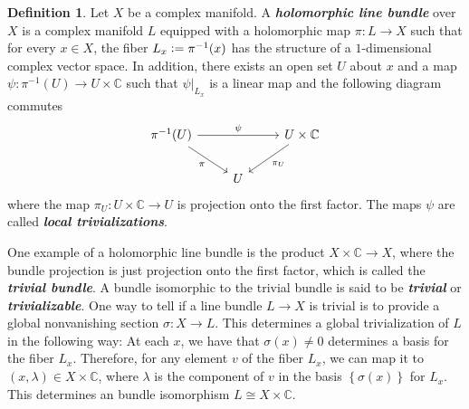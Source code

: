 \documentclass[psamsfonts, 12pt]{amsart}
\theoremstyle{definition}
\newtheorem{defn}[thm]{Definition}
\theoremstyle{remark}
\newcommand{\ib}[1]{\textbf{\textit{#1}}}
\newcommand{\C}{\mathbb{C}}
\newcommand{\inv}{^{-1}}
\newcommand{\set}[1]{\left\lbrace #1 \right\rbrace}
\newcommand{\defeq}{\vcentcolon=}
\begin{document}
%
\begin{defn}
Let $X$ be a complex manifold. A \ib{holomorphic line bundle} over $X$ is a complex
manifold $L$ equipped with a holomorphic map $\pi : L \to X$ such that for every
$x \in X$,  the fiber $L_x \defeq \pi\inv(x)$ has the structure of a $1$-dimensional
complex vector space. In addition, there exists an open set $U$ about $x$ and
a map $\psi : \pi\inv(U) \to U \times \C$ such that $\psi\vert_{L_x}$ is a linear
map and the following diagram commutes
\[\begin{tikzcd}
\pi\inv(U) \ar[dr, "\pi"'] \ar[rr, "\psi"] & & U \times \C \ar[dl, "\pi_U"]\\
& U
\end{tikzcd}\]
where the map $\pi_U : U \times \C \to U$ is projection onto the first factor.
The maps $\psi$ are called \ib{local trivializations}.
\end{defn}
%
One example of a holomorphic line bundle is the product $X \times \C \to X$, where
the bundle projection is just projection onto the first factor, which
is called the \ib{trivial bundle}. A bundle isomorphic to the trivial bundle
is said to be \ib{trivial} or \ib{trivializable}.
One way to tell if a line bundle $L \to X$ is trivial is to provide a global
nonvanishing section $\sigma : X \to L$. This determines a global trivialization of $L$
in the following way: At each $x$, we have that $\sigma(x) \neq 0$ determines a basis for
the fiber $L_x$. Therefore, for any element $v$ of the fiber $L_x$, we can map it
to $(x, \lambda) \in X \times \C$, where $\lambda$ is the component of $v$ in the basis
$\set{\sigma(x)}$ for $L_x$. This determines an bundle isomorphism
$L \cong X \times \C$. \\
\end{document}
